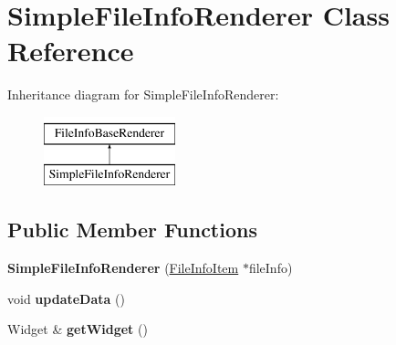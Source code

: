 \hypertarget{classSimpleFileInfoRenderer}{\section{\-Simple\-File\-Info\-Renderer \-Class \-Reference}
\label{classSimpleFileInfoRenderer}
}
\-Inheritance diagram for \-Simple\-File\-Info\-Renderer\-:\begin{figure}[H]
\begin{center}
\leavevmode
\includegraphics[height=2.000000cm]{classSimpleFileInfoRenderer}
\end{center}
\end{figure}
\subsection*{\-Public \-Member \-Functions}
\begin{DoxyCompactItemize}
\item 
\hypertarget{classSimpleFileInfoRenderer_a7ca07dcfb5ec11a7098e1b6f0e675261}{{\bfseries \-Simple\-File\-Info\-Renderer} (\hyperlink{classFileInfoItem}{\-File\-Info\-Item} $\ast$file\-Info)}\label{classSimpleFileInfoRenderer_a7ca07dcfb5ec11a7098e1b6f0e675261}

\item 
\hypertarget{classSimpleFileInfoRenderer_aae1b0e1a3f3d35a05fd1cd2dd2339d5c}{void {\bfseries update\-Data} ()}\label{classSimpleFileInfoRenderer_aae1b0e1a3f3d35a05fd1cd2dd2339d5c}

\item 
\hypertarget{classSimpleFileInfoRenderer_ab27b64bf1071fb5e1ae619521567e649}{\-Widget \& {\bfseries get\-Widget} ()}\label{classSimpleFileInfoRenderer_ab27b64bf1071fb5e1ae619521567e649}

\end{DoxyCompactItemize}
